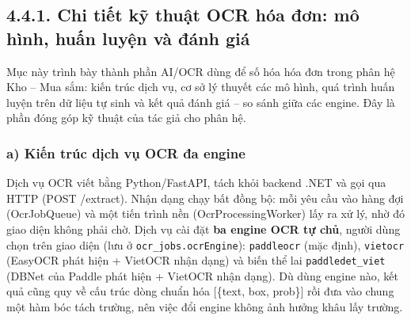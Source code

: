 \subsection*{4.4.1. Chi tiết kỹ thuật OCR hóa đơn: mô hình, huấn luyện và đánh giá}
Mục này trình bày thành phần AI/OCR dùng để số hóa hóa đơn trong phân hệ Kho – Mua sắm: kiến trúc dịch vụ, cơ sở lý thuyết các mô hình, quá trình huấn luyện trên dữ liệu tự sinh và kết quả đánh giá – so sánh giữa các engine. Đây là phần đóng góp kỹ thuật của tác giả cho phân hệ.

\subsubsection*{a) Kiến trúc dịch vụ OCR đa engine}
Dịch vụ OCR viết bằng Python/FastAPI, tách khỏi backend .NET và gọi qua HTTP (POST /extract). Nhận dạng chạy bất đồng bộ: mỗi yêu cầu vào hàng đợi (OcrJobQueue) và một tiến trình nền (OcrProcessingWorker) lấy ra xử lý, nhờ đó giao diện không phải chờ. Dịch vụ cài đặt \textbf{ba engine OCR tự chủ}, người dùng chọn trên giao diện (lưu ở \texttt{ocr\_jobs.ocrEngine}): \texttt{paddleocr} (mặc định), \texttt{vietocr} (EasyOCR phát hiện + VietOCR nhận dạng) và biến thể lai \texttt{paddledet\_viet} (DBNet của Paddle phát hiện + VietOCR nhận dạng). Dù dùng engine nào, kết quả cũng quy về cấu trúc dòng chuẩn hóa [\{text, box, prob\}] rồi đưa vào chung một hàm bóc tách trường, nên việc đổi engine không ảnh hưởng khâu lấy trường.

